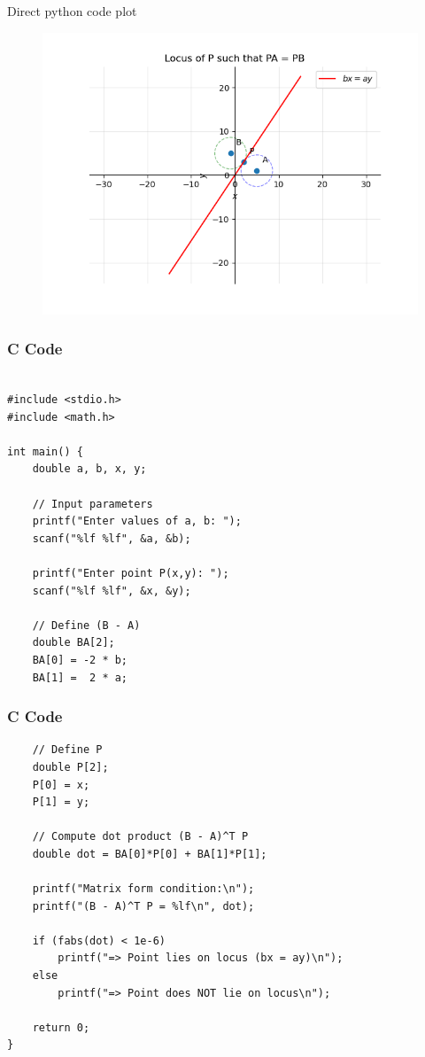 \documentclass{beamer}
\begin{document}
\begin{frame}{Direct python code plot}
   
\begin{figure}[H]
    \centering
    \includegraphics[width=0.9\columnwidth]{figs/fig2.png}
    \caption{}
    \label{fig:placeholder}
\end{figure}

\end{frame}
\begin{frame}[fragile]\frametitle{C Code}
\begin{lstlisting}    

#include <stdio.h>
#include <math.h>

int main() {
    double a, b, x, y;

    // Input parameters
    printf("Enter values of a, b: ");
    scanf("%lf %lf", &a, &b);

    printf("Enter point P(x,y): ");
    scanf("%lf %lf", &x, &y);

    // Define (B - A)
    double BA[2];
    BA[0] = -2 * b;
    BA[1] =  2 * a;
\end{lstlisting}
\end{frame}
\begin{frame}[fragile]\frametitle{C Code}
\begin{lstlisting}   
    // Define P
    double P[2];
    P[0] = x;
    P[1] = y;

    // Compute dot product (B - A)^T P
    double dot = BA[0]*P[0] + BA[1]*P[1];

    printf("Matrix form condition:\n");
    printf("(B - A)^T P = %lf\n", dot);

    if (fabs(dot) < 1e-6)
        printf("=> Point lies on locus (bx = ay)\n");
    else
        printf("=> Point does NOT lie on locus\n");

    return 0;
}
\end{lstlisting}
\end{frame}
\end{document}
